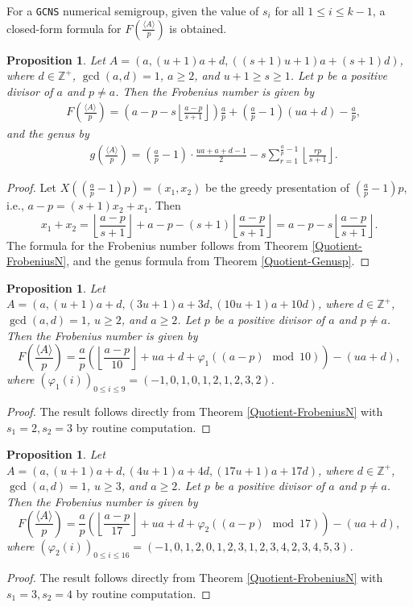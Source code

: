 \documentclass[reqno, 12pt]{article}
\newtheorem{prop}[thm]{Proposition}
\theoremstyle{mydefinition}
\theoremstyle{myremark}
\numberwithin{algorithm}{section}
\begin{document}
For a \texttt{GCNS} numerical semigroup, given the value of $s_i$ for all $1\leq i\leq k-1$, a closed-form formula for $F\left(\frac{\langle A\rangle}{p}\right)$ is obtained.

\begin{prop}
Let $A=(a, (u+1)a+d, ((s+1)u+1)a+(s+1)d)$, where $d\in \mathbb{Z}^{+}$, $\gcd(a,d)=1$, $a\geq 2$, and $u+1\geq s\geq 1$. 
Let $p$ be a positive divisor of $a$ and $p\neq a$. Then the Frobenius number is given by
\begin{align*}
&F\left(\frac{\langle A\rangle}{p}\right)=\left(a-p-s\left\lfloor \frac{a-p}{s+1}\right\rfloor\right)\frac{a}{p}+\left(\frac{a}{p}-1\right)(ua+d)-\frac{a}{p},
\end{align*}
and the genus by
\begin{align*}
&g\left(\frac{\langle A\rangle}{p}\right)=\left(\frac{a}{p}-1\right)\cdot \frac{ua+a+d-1}{2}-s\sum_{r=1}^{\frac{a}{p}-1} \left\lfloor \frac{rp}{s+1}\right\rfloor.
\end{align*}
\end{prop}
\begin{proof}
Let $X((\frac{a}{p}-1)p)=(x_1,x_2)$ be the greedy presentation of $(\frac{a}{p}-1)p$, i.e., $a-p=(s+1)x_2+x_1$. Then
$$x_1+x_2=\left\lfloor \frac{a-p}{s+1}\right\rfloor +a-p-(s+1)\left\lfloor \frac{a-p}{s+1}\right\rfloor=a-p-s \left\lfloor \frac{a-p}{s+1}\right\rfloor.$$
The formula for the Frobenius number follows from Theorem \ref{Quotient-FrobeniusN}, and the genus formula from Theorem \ref{Quotient-Genusp}.
\end{proof}

\begin{prop}
Let $A=(a, (u+1)a+d, (3u+1)a+3d, (10u+1)a+10d)$, where $d\in \mathbb{Z}^{+}$, $\gcd(a,d)=1$, $u\geq 2$, and $a\geq 2$. 
Let $p$ be a positive divisor of $a$ and $p\neq a$. Then the Frobenius number is given by
$$F\left(\frac{\langle A\rangle}{p}\right)=\frac{a}{p}\left(\left\lfloor \frac{a-p}{10}\right\rfloor +ua+d+\varphi_1((a-p) \mod 10)\right)-(ua+d),$$
where $(\varphi_1(i))_{0\leq i \leq 9} =(-1,0,1,0,1,2,1,2,3,2)$.
\end{prop}
\begin{proof}
The result follows directly from Theorem \ref{Quotient-FrobeniusN} with $s_1=2,s_2=3$ by routine computation.
\end{proof}

\begin{prop}
Let $A=(a, (u+1)a+d, (4u+1)a+4d, (17u+1)a+17d)$, where $d\in \mathbb{Z}^{+}$, $\gcd(a,d)=1$, $u\geq 3$, and $a\geq 2$. 
Let $p$ be a positive divisor of $a$ and $p\neq a$. Then the Frobenius number is given by
$$F\left(\frac{\langle A\rangle}{p}\right)=\frac{a}{p}\left(\left\lfloor \frac{a-p}{17}\right\rfloor +ua+d+\varphi_2((a-p) \mod 17)\right)-(ua+d),$$
where $(\varphi_2(i))_{0\leq i \leq 16} =(-1,0,1,2,0,1,2,3,1,2,3,4,2,3,4,5,3)$.
\end{prop}
\begin{proof}
The result follows directly from Theorem \ref{Quotient-FrobeniusN} with $s_1=3,s_2=4$ by routine computation.
\end{proof}
\end{document}
